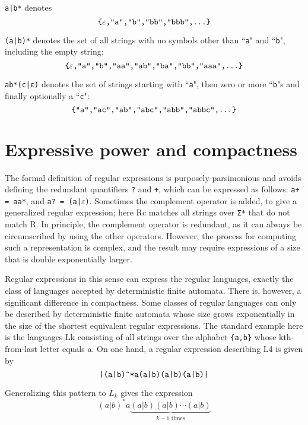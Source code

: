 \begin{compactitem}
\item \texttt{a|b*} denotes $$\text{\texttt{\{}} \varepsilon \text{\texttt{,"a","b","bb","bbb",...\}}}$$
\item \texttt{(a|b)*} denotes the set of all strings with no symbols other than ``\texttt{a}" and ``\texttt{b}", including the empty string: $$\text{\texttt{\{}} \varepsilon \text{\texttt{,"a","b","aa","ab","ba","bb","aaa",...\}}}$$
\item \texttt{ab*(c|ε)} denotes the set of strings starting with ``\texttt{a}", then zero or more ``\texttt{b}"s and finally optionally a ``\texttt{c}": $$\text{\texttt{\{"a","ac","ab","abc","abb","abbc",...\}}}$$

\end{compactitem}




\section{Expressive power and compactness}

The formal definition of regular expressions is purposely parsimonious and avoids defining the redundant quantifiers \texttt{?} and \texttt{+}, which can be expressed as follows: \texttt{a+ = aa*}, and \texttt{a? = (a|$\varepsilon$)}. Sometimes the complement operator is added, to give a generalized regular expression; here Rc matches all strings over \texttt{Σ*} that do not match R. In principle, the complement operator is redundant, as it can always be circumscribed by using the other operators. However, the process for computing such a representation is complex, and the result may require expressions of a size that is double exponentially larger.

Regular expressions in this sense can express the regular languages, exactly the class of languages accepted by deterministic finite automata. There is, however, a significant difference in compactness. Some classes of regular languages can only be described by deterministic finite automata whose size grows exponentially in the size of the shortest equivalent regular expressions. The standard example here is the languages Lk consisting of all strings over the alphabet \texttt{\{a,b\}} whose kth-from-last letter equals a. On one hand, a regular expression describing L4 is given by $$\text{\texttt{|(a|b)\^{}*a(a|b)(a|b)(a|b)|}}$$


Generalizing this pattern to $L_k$ gives the expression$$(a|b)^*a\underbrace{(a|b)(a|b)\cdots(a|b)}_{k-1\text{  times}}$$

